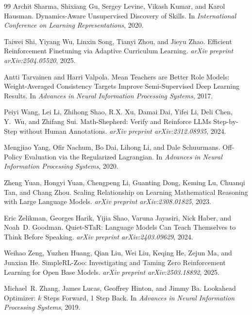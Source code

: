 \documentclass{article}
\begin{document}
\begin{thebibliography}{99}
Archit Sharma, Shixiang Gu, Sergey Levine, Vikash Kumar, and Karol Hausman.
\newblock Dynamics-Aware Unsupervised Discovery of Skills.
\newblock In \emph{International Conference on Learning Representations}, 2020.

Taiwei Shi, Yiyang Wu, Linxin Song, Tianyi Zhou, and Jieyu Zhao.
\newblock Efficient Reinforcement Finetuning via Adaptive Curriculum Learning.
\newblock \emph{arXiv preprint arXiv:2504.05520}, 2025.

Antti Tarvainen and Harri Valpola.
\newblock Mean Teachers are Better Role Models: Weight-Averaged Consistency Targets Improve Semi-Supervised Deep Learning Results.
\newblock In \emph{Advances in Neural Information Processing Systems}, 2017.

Peiyi Wang, Lei Li, Zhihong Shao, R.X. Xu, Damai Dai, Yifei Li, Deli Chen, Y.~Wu, and Zhifang Sui.
\newblock Math-Shepherd: Verify and Reinforce LLMs Step-by-Step without Human Annotations.
\newblock \emph{arXiv preprint arXiv:2312.08935}, 2024.

Mengjiao Yang, Ofir Nachum, Bo Dai, Lihong Li, and Dale Schuurmans.
\newblock Off-Policy Evaluation via the Regularized Lagrangian.
\newblock In \emph{Advances in Neural Information Processing Systems}, 2020.

Zheng Yuan, Hongyi Yuan, Chengpeng Li, Guanting Dong, Keming Lu, Chuanqi Tan, and Chang Zhou.
\newblock Scaling Relationship on Learning Mathematical Reasoning with Large Language Models.
\newblock \emph{arXiv preprint arXiv:2308.01825}, 2023.

Eric Zelikman, Georges Harik, Yijia Shao, Varuna Jayasiri, Nick Haber, and Noah~D. Goodman.
\newblock Quiet-STaR: Language Models Can Teach Themselves to Think Before Speaking.
\newblock \emph{arXiv preprint arXiv:2403.09629}, 2024.

Weihao Zeng, Yuzhen Huang, Qian Liu, Wei Liu, Keqing He, Zejun Ma, and Junxian He.
\newblock SimpleRL-Zoo: Investigating and Taming Zero Reinforcement Learning for Open Base Models.
\newblock \emph{arXiv preprint arXiv:2503.18892}, 2025.

Michael~R. Zhang, James Lucas, Geoffrey Hinton, and Jimmy Ba.
\newblock Lookahead Optimizer: $k$ Steps Forward, 1 Step Back.
\newblock In \emph{Advances in Neural Information Processing Systems}, 2019.


\end{thebibliography}
\end{document}
